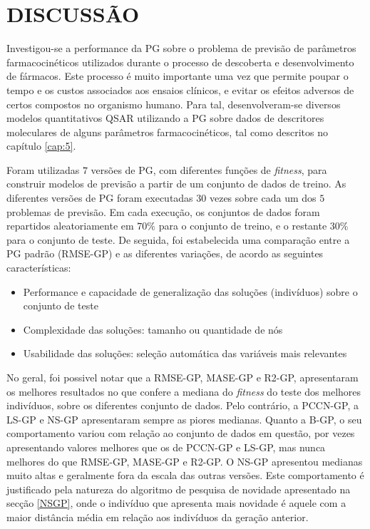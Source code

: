 \section{DISCUSSÃO}
\label{sec:6discussao}

Investigou-se a performance da \ac{PG} sobre o problema de previsão de parâmetros farmacocinéticos utilizados durante o processo de 
descoberta e desenvolvimento de fármacos. Este processo é muito importante uma vez que permite poupar o tempo e os custos associados 
aos ensaios clínicos, e evitar os efeitos adversos de certos compostos no organismo humano. Para tal, desenvolveram-se diversos modelos 
quantitativos \ac{QSAR} utilizando a \ac{PG} sobre dados de descritores moleculares de alguns parâmetros farmacocinéticos, 
tal como descritos no capítulo \ref{cap:5}.

Foram utilizadas $7$ versões de PG, com diferentes funções de \emph{fitness}, para construir modelos de previsão a partir 
de um conjunto de dados de treino. As diferentes versões de \ac{PG} foram executadas $30$ vezes sobre cada um dos $5$ problemas
de previsão. Em cada execução, os conjuntos de dados foram repartidos aleatoriamente em $70\%$ para o conjunto de 
treino, e o restante $30\%$ para o conjunto de teste. De seguida, foi estabelecida uma comparação entre a \ac{PG} padrão (RMSE-GP) e as 
diferentes variações, de acordo as seguintes características:

\begin{itemize}
	\item {Performance e capacidade de generalização das soluções (indivíduos) sobre o conjunto de teste}
  	\item {Complexidade das soluções: tamanho ou quantidade de nós}
  	\item {Usabilidade das soluções: seleção automática das variáveis mais relevantes}
\end{itemize}

No geral, foi possivel notar que a RMSE-GP, MASE-GP e R2-GP, apresentaram os melhores resultados no que confere a mediana do
\emph{fitness} do teste dos melhores indivíduos, sobre os diferentes conjunto de dados. 
Pelo contrário, a PCCN-GP, a LS-GP e NS-GP apresentaram sempre as piores medianas. Quanto a B-GP, o seu comportamento
variou com relação ao conjunto de dados em questão, por vezes apresentando valores melhores que os de PCCN-GP e LS-GP, mas
nunca melhores do que RMSE-GP, MASE-GP e R2-GP. O NS-GP apresentou medianas muito altas e geralmente fora da escala das outras
versões. Este comportamento é justificado pela natureza do algoritmo de pesquisa de novidade apresentado na secção \ref{NSGP},
onde o indivíduo que apresenta mais novidade é aquele com a maior distância média em relação aos indivíduos da geração anterior.

